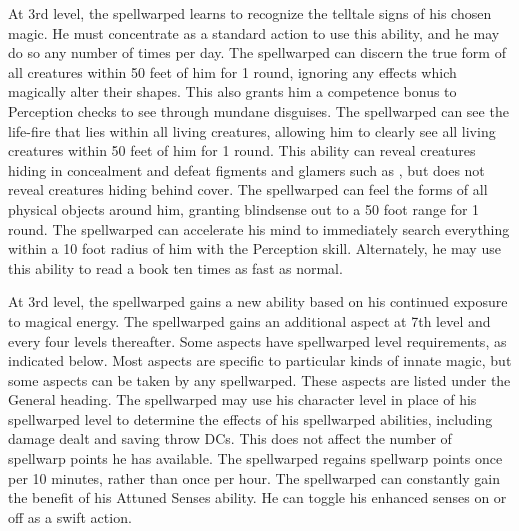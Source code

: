  At 3rd level, the spellwarped learns to recognize the telltale signs of his chosen magic. He must concentrate as a standard action to use this ability, and he may do so any number of times per day.
 The spellwarped can discern the true form of all creatures within 50 feet of him for 1 round, ignoring any effects which magically alter their shapes. This also grants him a  competence bonus to Perception checks to see through mundane disguises.
 The spellwarped can see the life-fire that lies within all living creatures, allowing him to clearly see all living creatures within 50 feet of him for 1 round. This ability can reveal creatures hiding in concealment and defeat figments and glamers such as , but does not reveal creatures hiding behind cover.
 The spellwarped can feel the forms of all physical objects around him, granting blindsense out to a 50 foot range for 1 round.
 The spellwarped can accelerate his mind to immediately search everything within a 10 foot radius of him with the Perception skill. Alternately, he may use this ability to read a book ten times as fast as normal.

 At 3rd level, the spellwarped gains a new ability based on his continued exposure to magical energy. The spellwarped gains an additional aspect at 7th level and every four levels thereafter. Some aspects have spellwarped level requirements, as indicated below. Most aspects are specific to particular kinds of innate magic, but some aspects can be taken by any spellwarped. These aspects are listed under the General heading.
 The spellwarped may use his character level in place of his spellwarped level to determine the effects of his spellwarped abilities, including damage dealt and saving throw DCs. This does not affect the number of spellwarp points he has available.
 The spellwarped regains spellwarp points once per 10 minutes, rather than once per hour.
 The spellwarped can constantly gain the benefit of his Attuned Senses ability. He can toggle his enhanced senses on or off as a swift action.

